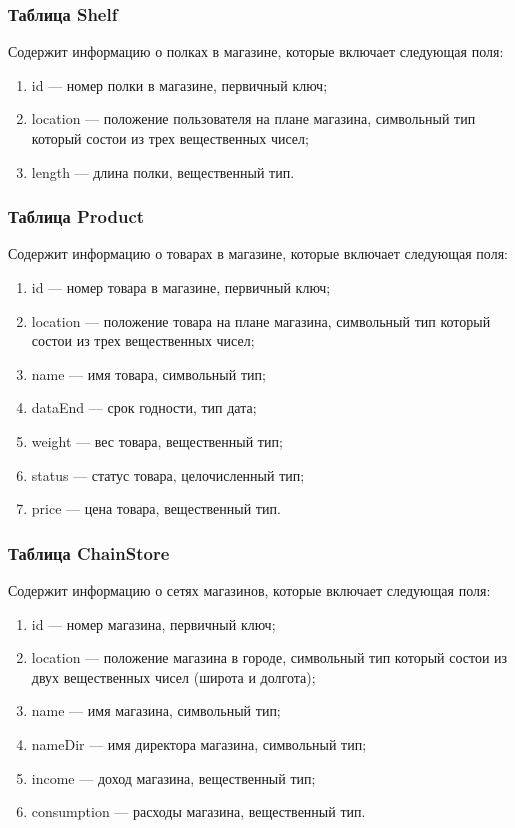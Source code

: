 \subsubsection{Таблица Shelf}

Содержит информацию о полках в магазине, которые включает следующая поля:

\begin{enumerate}[label=\arabic*.]
    \item id --- номер полки в магазине, первичный ключ;
    \item location --- положение пользователя на плане магазина, символьный тип 
    который состои из трех вещественных чисел;
    \item length --- длина полки, вещественный тип.
\end{enumerate}

\subsubsection{Таблица Product}

Содержит информацию о товарах в магазине, которые включает следующая поля:

\begin{enumerate}[label=\arabic*.]
    \item id --- номер товара в магазине, первичный ключ;
    \item location --- положение товара на плане магазина, символьный тип 
    который состои из трех вещественных чисел;
    \item name --- имя товара, символьный тип;
    \item dataEnd --- срок годности, тип дата;
    \item weight --- вес товара, вещественный тип;
    \item status --- статус товара, целочисленный тип;
    \item price --- цена товара, вещественный тип.
\end{enumerate}

\subsubsection{Таблица ChainStore}

Содержит информацию о сетях магазинов, которые включает следующая поля:

\begin{enumerate}[label=\arabic*.]
    \item id --- номер магазина, первичный ключ;
    \item location --- положение магазина в городе, символьный тип 
    который состои из двух вещественных чисел (широта и долгота);
    \item name --- имя магазина, символьный тип;
    \item nameDir --- имя директора магазина, символьный тип;
    \item income --- доход магазина, вещественный тип;
    \item consumption --- расходы магазина, вещественный тип.
\end{enumerate}

